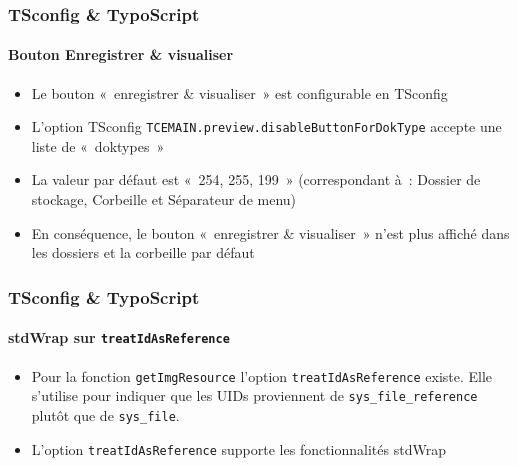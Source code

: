 \begin{frame}[fragile]
	\frametitle{TSconfig \& TypoScript}
	\framesubtitle{Bouton Enregistrer \& visualiser}

	\begin{itemize}

		\item Le bouton «~enregistrer \& visualiser~» est configurable en TSconfig

		\item L'option TSconfig \texttt{TCEMAIN.preview.disableButtonForDokType} accepte une liste de «~doktypes~»

		\item La valeur par défaut est «~254, 255, 199~» (correspondant à~: Dossier de stockage, Corbeille et Séparateur de menu)

		\item En conséquence, le bouton «~enregistrer \& visualiser~» n'est plus affiché dans les dossiers et la corbeille par défaut

	\end{itemize}

\end{frame}

\begin{frame}[fragile]
	\frametitle{TSconfig \& TypoScript}
	\framesubtitle{stdWrap sur \texttt{treatIdAsReference}}

	\begin{itemize}

		\item Pour la fonction \texttt{getImgResource} l'option \texttt{treatIdAsReference} existe.
			Elle s'utilise pour indiquer que les UIDs proviennent de \texttt{sys\_file\_reference}
			plutôt que de \texttt{sys\_file}.

		\item L'option \texttt{treatIdAsReference} supporte les fonctionnalités stdWrap

	\end{itemize}

\end{frame}

